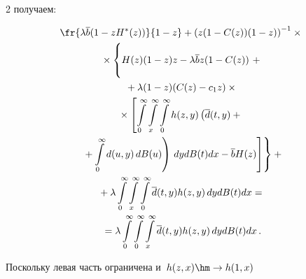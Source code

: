 \begin{multicols}{2}
получаем:


\begin{multline*}


\fr{ \lambda \overline{b} (1-z H^*(z))}{ 1-z}+


\left ( z(1-C(z))(1-z) \right )^{-1}\times{}\\


{}\times \left \{


\vphantom{\int\limits_0^\infty}


H(z)(1-z)z - \lambda \overline{b} z (1-C(z))


\right.


+{}


\\


{}+


\lambda(1-z) (C(z)-c_1 z)\times{}\\


{}\times


\left[


\int\limits_0^\infty


\int\limits_x^\infty


\int\limits_0^\infty


h(z,y) \left(


\d(t,y) + {}\right.\right.\\


\left.\left.\left.{}+\int\limits_0^\infty d(u,y) \, dB(u)


\right)\,


dy  dB(t)


dx -


\overline{b} H(z)


\right ] \right\}


+ {}\\


{}+ \lambda \int\limits_0^\infty


\int\limits_x^\infty \int\limits_0^\infty


\d(t,y) h(z,y) \,dy dB(t) dx


={}\\


{}= \lambda \int\limits_0^\infty \int\limits_0^\infty


\int\limits_x^\infty \d(t,y) h(z,y) \,dy  dB(t) dx\,.




\end{multline*}





\noindent Поскольку левая часть ограничена и~$h(z,x) \hm\rightarrow h(1,x)$ 



\end{multicols}
